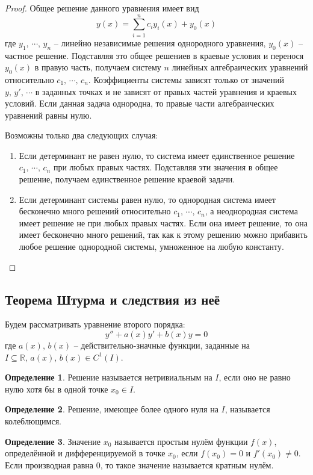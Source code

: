 \documentclass[a4paper,12pt]{article}
\theoremstyle{plain}
\theoremstyle{definition}
\newtheorem{definition}{Определение}[section]
\theoremstyle{remark}
\begin{document}
\begin{proof}
	Общее решение данного уравнения имеет вид
	\[y(x) = \sum_{i = 1}^n c_iy_i(x) + y_0(x)\]
	где $y_1,\,\cdots,\,y_n$ -- линейно независимые решения однородного уравнения, $y_0(x)$ -- частное решение. Подставляя это общее решениев в краевые условия и перенося $y_0(x)$ в правую часть, получаем систему $n$ линейных алгебраических уравнений относительно $c_1,\,\cdots,\,c_n$. Коэффициенты системы зависят только от значений $y,\, y',\,\cdots$ в заданных точках и не зависят от правых частей уравнения и краевых условий. Если данная задача однородна, то правые части алгебраических уравнений равны нулю.

	Возможны только два следующих случая:
	\begin{enumerate}
		\item Если детерминант не равен нулю, то система имеет единственное решение $c_1,\,\cdots,\,c_n$ при любых правых частях. Подставляя эти значения в общее решение, получаем единственное решение краевой задачи.
		\item Если детерминант системы равен нулю, то однородная система имеет бесконечно много решений относительно $c_1,\,\cdots,\,c_n$, а неоднородная система имеет решение не при любых правых частях. Если она имеет решение, то она имеет бесконечно много решений, так как к этому решению можно прибавить любое решение однородной системы, умноженное на любую константу.
	\end{enumerate}
\end{proof}

\subsection{Теорема Штурма и следствия из неё}
Будем рассматривать уравнение второго порядка:
\[y'' + a(x)y' + b(x)y = 0\]
где $a(x),\,b(x)$ -- действительно-значные функции, заданные на $I \subseteq \mathbb{R},\, a(x),\, b(x) \in C^1(I)$.

\begin{definition}
	Решение называется нетривиальным на $I$, если оно не равно нулю хотя бы в одной точке $x_0 \in I$.
\end{definition}

\begin{definition}
	Решение, имеющее более одного нуля на $I$, называется колеблющимся.
\end{definition}

\begin{definition}
	Значение $x_0$ называется простым нулём функции $f(x)$, определённой и дифференцируемой в точке $x_0$, если $f(x_0) = 0$ и $f'(x_0) \neq 0$. Если производная равна $0$, то такое значение называется кратным нулём.
\end{definition}
\end{document}
